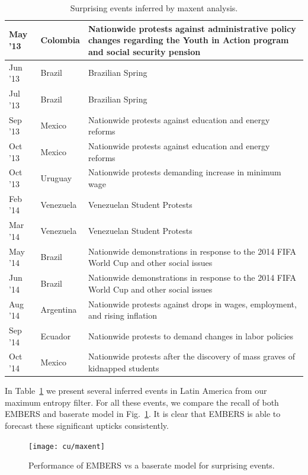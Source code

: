\begin{table}
\caption{Surprising events inferred by maxent analysis.}
\renewcommand{\arraystretch}{1.1}
\vspace{-3mm}
 \centering
 \begin{tabular}{|l|l|m{5cm}|}
 \hline
May '13  &  Colombia	 &  Nationwide protests against administrative policy changes regarding the
Youth in Action program and social security pension \\ \hline
Jun '13  &  Brazil  &  Brazilian Spring \\ \hline
Jul '13  &  Brazil  &  Brazilian Spring \\ \hline
Sep '13  &  Mexico  &  Nationwide protests against education and energy reforms \\ \hline
Oct '13  &  Mexico  &  Nationwide protests against education and energy reforms \\ \hline
Oct '13  &  Uruguay  &  Nationwide protests demanding increase in minimum wage \\ \hline
Feb '14  &  Venezuela	  &  Venezuelan Student Protests \\ \hline
Mar '14  &  Venezuela  &  	Venezuelan Student Protests \\ \hline
May '14  &  Brazil  &  Nationwide demonstrations in response to the 2014 FIFA World Cup and other social issues \\ \hline
Jun '14  &  Brazil  &  Nationwide demonstrations in response to the 2014 FIFA World Cup and other social issues \\ \hline
Aug '14  &  Argentina	  &  Nationwide protests against drops in wages, employment, and rising inflation \\ \hline
Sep '14  &  Ecuador  &  Nationwide protests to demand changes in labor policies \\ \hline
Oct '14  &  Mexico  &  Nationwide protests after the discovery of mass graves of kidnapped students  \\ \hline
\end{tabular}
\label{tab:maxentEvents}
\end{table}

In Table~\ref{tab:maxentEvents} we present several inferred events in Latin America from our maximum entropy
filter.
For all these events, we compare the recall of both EMBERS and baserate model in Fig.~\ref{fig:maxent}.
It is clear that EMBERS is able to forecast these significant upticks consistently.

\begin{figure}[H]
\centering
\texttt{[image: cu/maxent]}
\caption{Performance of EMBERS vs a baserate model for surprising events.}
\label{fig:maxent}
\end{figure}
